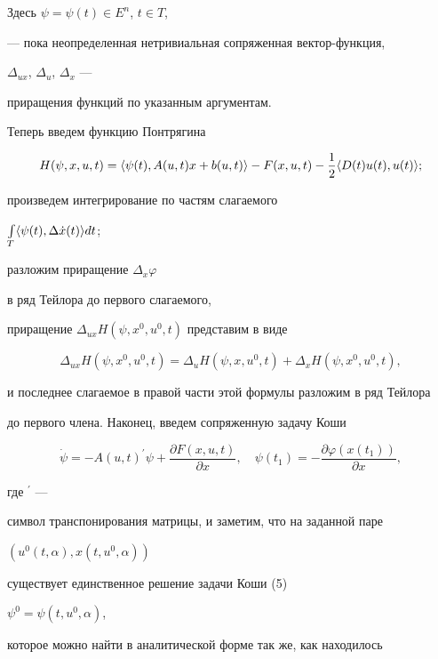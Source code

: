 Здесь $\psi=\psi(t)\in E^n$, $t\in T$, 


--- пока неопределенная нетривиальная сопряженная вектор-функция,


$\Delta_{ux}$, $\Delta_u$, $\Delta_x$ --- 


приращения функций по указанным аргументам.





Теперь введем функцию Понтрягина


$$


H(\psi,x,u,t)=\la\psi(t), A(u,t)x+b(u,t)\ra


-F(x,u,t)-\frac{1}{2}\la D(t)u(t),u(t)\ra;


$$


произведем интегрирование по частям слагаемого 


$\int\limits_T \langle\psi(t),\Delta \Dot x(t)\rangle dt$;


разложим приращение $\Delta_x\varphi$


в ряд Тейлора до первого слагаемого, 


приращение $\Delta_{ux}H(\psi,x^0,u^0,t)$ представим в виде


$$


\Delta_{ux}H(\psi,x^0,u^0,t)=\Delta_uH(\psi,x,u^0,t)+


\Delta_xH(\psi,x^0,u^0,t),


$$


и последнее слагаемое в правой части этой формулы разложим в ряд Тейлора 


до первого члена. Наконец, введем сопряженную задачу Коши


\begin{equation}


\Dot \psi=-A(u,t)^{\prime}\psi+\frac{\partial F(x,u,t)}{\partial x},\quad


\psi(t_1)=-\frac{\partial \varphi(x(t_1))}{\partial x}, 


\end{equation}


где $^{\prime}$ --- 


символ транспонирования матрицы, и заметим, что на заданной паре 


$(u^0(t,\alpha), x(t,u^0,\alpha))$


существует единственное решение задачи Коши (5)


$\psi^0=\psi(t,u^0,\alpha)$,


которое можно найти в аналитической форме так же, как находилось 



